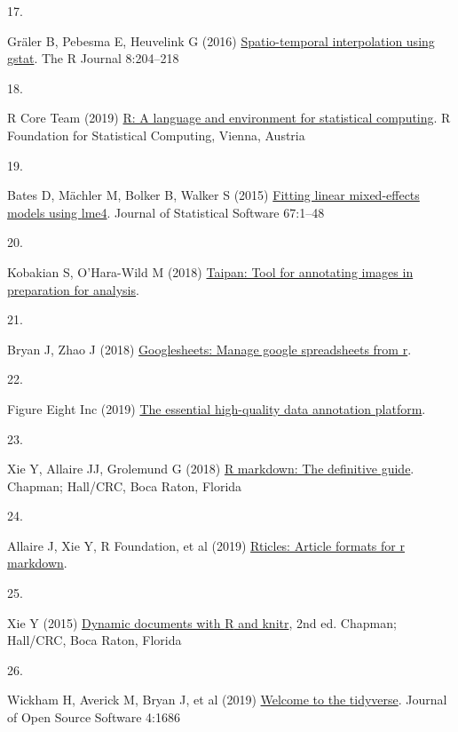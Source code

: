 \documentclass[
]{article}
\newlength{\cslhangindent}
\newlength{\csllabelwidth}
\newenvironment{CSLReferences}[2] %
 {\begin{list}{}{%
  \setlength{\itemindent}{0pt}
  \setlength{\leftmargin}{0pt}
  \setlength{\parsep}{0pt}
  \ifodd #1
   \setlength{\leftmargin}{\cslhangindent}
   \setlength{\itemindent}{-1\cslhangindent}
  \fi
  \setlength{\itemsep}{#2\baselineskip}}}
 {\end{list}}
\newcommand{\CSLLeftMargin}[1]{\parbox[t]{\csllabelwidth}{\strut#1\strut}}
\newcommand{\CSLRightInline}[1]{\parbox[t]{\linewidth - \csllabelwidth}{\strut#1\strut}}
\begin{document}
\begin{CSLReferences}{0}{1}
\CSLLeftMargin{17. }%
\CSLRightInline{Gräler B, Pebesma E, Heuvelink G (2016)
\href{https://journal.r-project.org/archive/2016/RJ-2016-014/index.html}{Spatio-temporal
interpolation using gstat}. The R Journal 8:204--218}

\CSLLeftMargin{18. }%
\CSLRightInline{R Core Team (2019) \href{https://www.R-project.org/}{R:
A language and environment for statistical computing}. R Foundation for
Statistical Computing, Vienna, Austria}

\CSLLeftMargin{19. }%
\CSLRightInline{Bates D, Mächler M, Bolker B, Walker S (2015)
\href{https://doi.org/10.18637/jss.v067.i01}{Fitting linear
mixed-effects models using {lme4}}. Journal of Statistical Software
67:1--48}

\CSLLeftMargin{20. }%
\CSLRightInline{Kobakian S, O'Hara-Wild M (2018)
\href{https://CRAN.R-project.org/package=taipan}{Taipan: Tool for
annotating images in preparation for analysis}. }

\CSLLeftMargin{21. }%
\CSLRightInline{Bryan J, Zhao J (2018)
\href{https://CRAN.R-project.org/package=googlesheets}{Googlesheets:
Manage google spreadsheets from r}. }

\CSLLeftMargin{22. }%
\CSLRightInline{Figure Eight Inc (2019)
\href{https://www.figure-eight.com/}{The essential high-quality data
annotation platform}. }

\CSLLeftMargin{23. }%
\CSLRightInline{Xie Y, Allaire JJ, Grolemund G (2018)
\href{https://bookdown.org/yihui/rmarkdown}{R markdown: The definitive
guide}. Chapman; Hall/CRC, Boca Raton, Florida}

\CSLLeftMargin{24. }%
\CSLRightInline{Allaire J, Xie Y, R Foundation, et al (2019)
\href{https://CRAN.R-project.org/package=rticles}{Rticles: Article
formats for r markdown}. }

\CSLLeftMargin{25. }%
\CSLRightInline{Xie Y (2015) \href{https://yihui.org/knitr/}{Dynamic
documents with {R} and knitr}, 2nd ed. Chapman; Hall/CRC, Boca Raton,
Florida}

\CSLLeftMargin{26. }%
\CSLRightInline{Wickham H, Averick M, Bryan J, et al (2019)
\href{https://doi.org/10.21105/joss.01686}{Welcome to the {tidyverse}}.
Journal of Open Source Software 4:1686}


\end{CSLReferences}
\end{document}
